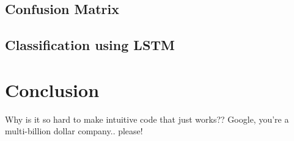 \documentclass[a4paper, article, oneside, USenglish, IN5460]{memoir}
\begin{document}
\section{Confusion Matrix}


\section{Classification using LSTM}


\chapter{Conclusion}

Why is it so hard to make intuitive code that just works?? Google, you're a multi-billion dollar company.. please! 
\newpage

\nocite{tensorflow2015-whitepaper}
\nocite{dataset}

\printbibliography{}

\vspace*{10mm}
\end{document}
